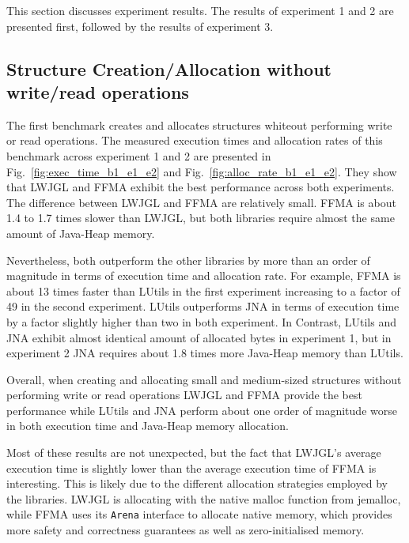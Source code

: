 This section discusses experiment results.
The results of experiment 1 and 2 are presented first, followed by the results of experiment 3.

\subsection{Structure Creation/Allocation without write/read operations}\label{subsec:b1-e1-e2-results}

The first benchmark creates and allocates structures whiteout performing write or read operations.
The measured execution times and allocation rates of this benchmark across experiment 1 and 2 are presented in
Fig.~\ref{fig:exec_time_b1_e1_e2} and Fig.~\ref{fig:alloc_rate_b1_e1_e2}.
They show that LWJGL and FFMA exhibit the best performance across both experiments.
The difference between LWJGL and FFMA are relatively small.
FFMA is about 1.4 to 1.7 times slower than LWJGL, but both libraries require almost the same amount of Java-Heap memory.

Nevertheless, both outperform the other libraries by more than an order of magnitude in terms of execution time and allocation rate.
For example, FFMA is about 13 times faster than LUtils in the first experiment increasing to a factor of 49 in the second experiment.
LUtils outperforms JNA in terms of execution time by a factor slightly higher than two in both experiment.
In Contrast, LUtils and JNA exhibit almost identical amount of allocated bytes in experiment 1, but in experiment 2 JNA
requires about 1.8 times more Java-Heap memory than LUtils.

Overall, when creating and allocating small and medium-sized structures without performing write or read operations LWJGL and FFMA
provide the best performance while LUtils and JNA perform about one order of magnitude worse in both execution time and
Java-Heap memory allocation.


Most of these results are not unexpected, but the fact that LWJGL’s average execution time is slightly lower than the average
execution time of FFMA is interesting.
This is likely due to the different allocation strategies employed by the libraries.
LWJGL is allocating with the native malloc function from jemalloc, while FFMA uses its \texttt{Arena} interface to allocate native
memory, which provides more safety and correctness guarantees as well as zero-initialised memory.

